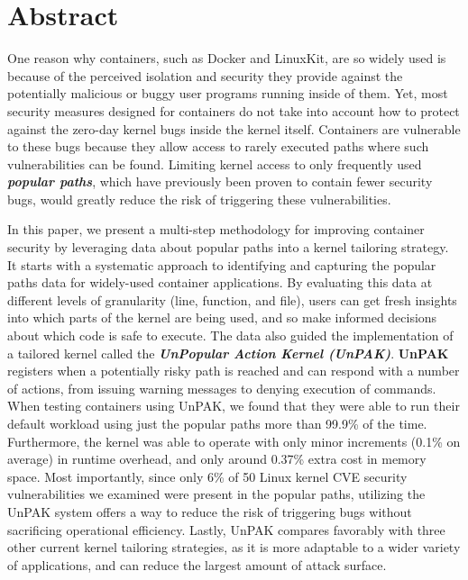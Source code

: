 \section*{Abstract}
One reason why containers, such as Docker and LinuxKit, are so widely used is because of the perceived isolation and security they provide against 
the potentially malicious or buggy user programs running inside of them. Yet, most security measures designed for containers do not take into account 
how to protect against the zero-day kernel bugs inside the kernel itself. 
Containers are vulnerable to these bugs because they allow access to rarely executed paths where such vulnerabilities can be found. 
Limiting kernel access to only frequently used \textbf{\textit{popular paths}}, which have previously been proven to contain fewer security bugs, 
would greatly reduce the risk of triggering these vulnerabilities. 

In this paper, we present a multi-step methodology for improving container security by leveraging data about popular paths into a kernel tailoring strategy. 
It starts with a systematic approach to identifying and capturing the popular paths data for widely-used container applications. 
By evaluating this data at different levels of granularity (line, function, and file), users can get fresh insights into which parts of the kernel are being used, 
and so make informed decisions about which code is safe to execute. 
The data also guided the implementation of a tailored kernel called the \textbf{\textit{UnPopular Action Kernel (UnPAK)}}. 
\textbf{UnPAK} registers when a potentially risky path is reached and can respond with a number of actions, from issuing warning messages to denying execution of commands. 
When testing containers using UnPAK, we found that they were able to run their default workload using just the popular paths more than 99.9\% of the time. 
Furthermore, the kernel was able to operate with only minor increments (0.1\% on average) in runtime overhead, and only around 0.37\% extra cost in memory space. 
Most importantly, since only 6\% of 50 Linux kernel CVE security vulnerabilities we examined were present in the popular paths, 
utilizing the UnPAK system offers a way to reduce the risk of triggering bugs without sacrificing operational efficiency. 
Lastly, UnPAK compares favorably with three other current kernel tailoring strategies, as it is more adaptable to a wider variety of applications, and can reduce the largest amount of attack surface. 